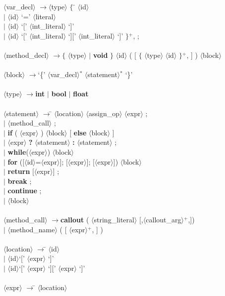 \documentclass{article}
\newcommand{\angl}[1]{$\langle$#1$\rangle$}
\newcommand{\curl}[1]{$\{$ #1 $\}$}
\newcommand{\lra}[0]{$\longrightarrow$}
\begin{document}
\begin{tabbing}
\angl{var\_decl} \lra \angl{type} \curl{ \= \angl{id} \\
\> $|$ \angl{id} `=' \angl{literal} \\
\> $|$ \angl{id} `[' \angl{int\_literal} `]' \\
\> $|$ \angl{id} `[' \angl{int\_literal} `][' \angl{int\_literal} `]'}$^+$, ; \\ \\
\angl{method\_decl} \lra \curl{\angl{type} $|$ \textbf{void} } \angl{id} ( [ \curl{\angl{type} \angl{id}}$^+$, ]  ) \angl{block} \\ \\
\angl{block} \lra `\{' \angl{var\_decl}$^*$ \angl{statement}$^*$ `\}' \\ \\
\angl{type} \lra \textbf{int} $|$ \textbf{bool} $|$ \textbf{float} \\ \\
\angl{statement} \lra \= \angl{location} \angl{assign\_op} \angl{expr} ; \\
\> $|$ \angl{method\_call} ; \\
\> $|$ \textbf{if} ( \angl{expr} ) \angl{block} [ \textbf{else} \angl{block} ] \\
\> $|$ \angl{expr} \textbf{?} \angl{statement} \textbf{:} \angl{statement} ; \\
\> $|$ \textbf{while}(\angl{expr}) \angl{block} \\
\> $|$ \textbf{for} ([\angl{id}=\angl{expr}]; [\angl{expr}]; [\angl{expr}]) \angl{block} \\
\> $|$ \textbf{return}  [\angl{expr}] ; \\
\> $|$ \textbf{break} ; \\
\> $|$ \textbf{continue} ; \\
\> $|$ \angl{block} \\ \\
\angl{method\_call} \lra \= \textbf{callout} ( \angl{string\_literal} [,\angl{callout\_arg}$^+$,]) \\
\> $|$ \angl{method\_name} ( [ \angl{expr}$^+$, ] ) \\ \\
\angl{location} \lra \= \angl{id} \\
\> $|$ \angl{id}`[' \angl{expr} `]' \\
\> $|$ \angl{id}`[' \angl{expr} `][' \angl{expr} `]' \\ \\
\angl{expr} \lra \= \angl{location} \\

\end{tabbing}
\end{document}
